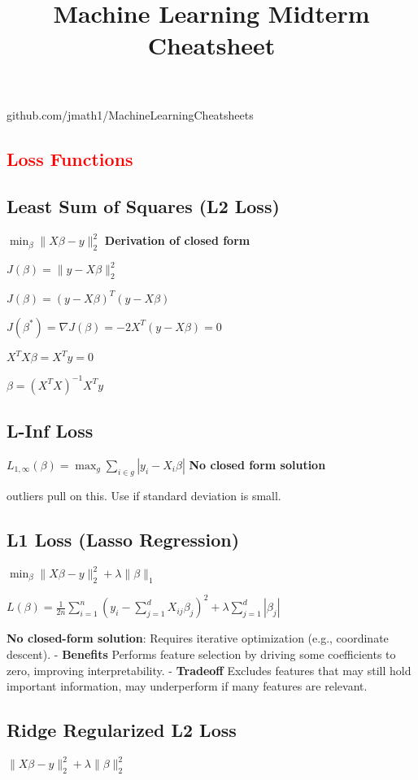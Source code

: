 \documentclass[10pt]{article}
\title{\vspace{-2cm} Machine Learning Midterm Cheatsheet}
\date{}
\begin{document}
\footnotesize

\begin{center}
  github.com/jmath1/MachineLearningCheatsheets
\end{center}
  
\begin{multicols}{2}

\section*{\textcolor{red}{Loss Functions}}
\subsection*{Least Sum of Squares (L2 Loss)}
$\min_{\beta} \|X\beta - y\|_2^2$
\textbf{Derivation of closed form}

$J(\beta) = \|y - X\beta\|_2^2$


$J(\beta) = (y - X\beta)^T(y - X\beta)$

$J(\beta^{*}) = \nabla J(\beta) = -2X^T(y - X\beta) = 0$

$X^T X \beta = X^T y = 0$

$\beta = {(X^T X)}^{-1} X^T y$

\subsection*{L-Inf Loss}
$L_{1,\infty}(\beta) = \max_{g} \sum_{i \in g} |y_i - X_i \beta|$
\textbf{No closed form solution}

outliers pull on this. Use if standard deviation is small.
\subsection*{L1 Loss (Lasso Regression)}
$\min_{\beta} \|X\beta - y\|_2^2 + \lambda \|\beta\|_1$

$L(\beta) = \frac{1}{2n} \sum_{i=1}^{n} \left( y_i - \sum_{j=1}^{d} X_{ij} \beta_j \right)^2 + \lambda \sum_{j=1}^{d} |\beta_j|$

\textbf{No closed-form solution}: Requires iterative optimization (e.g., coordinate descent).
- \textbf{Benefits} Performs feature selection by driving some coefficients to zero, improving interpretability.
- \textbf{Tradeoff} Excludes features that may still hold important information, may underperform if many features are relevant.

\subsection*{Ridge Regularized L2 Loss}
$\|X\beta - y\|_2^2 + \lambda\|\beta\|_2^2$


\end{multicols}
\end{document}
